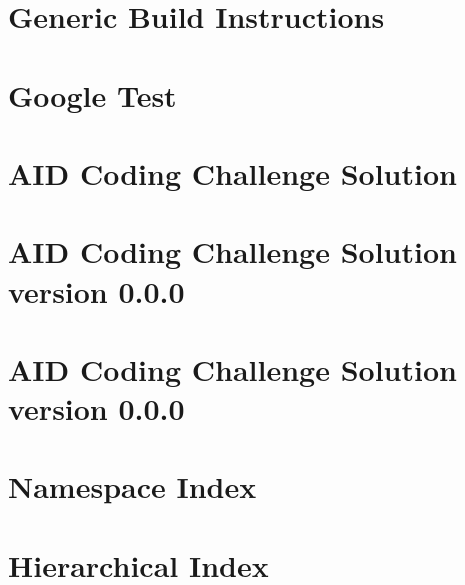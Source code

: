 \documentclass[twoside]{book}
\newcommand{\+}{\discretionary{\mbox{\scriptsize$\hookleftarrow$}}{}{}}
\begin{document}
\chapter{Generic Build Instructions}
\label{md___users_fjp_git_bachelor_bachelor-master_updated_vfinal_googletest-1_88_80_googletest__r_e_a_d_m_e}

\chapter{Google Test}
\label{md___users_fjp_git_bachelor_bachelor-master_updated_vfinal_googletest-1_88_80__r_e_a_d_m_e}

\chapter{A\+ID Coding Challenge Solution}
\label{md___users_fjp_git_bachelor_bachelor-master_updated_vfinal__r_e_a_d_m_e}

\chapter{A\+ID Coding Challenge Solution version 0.0.0}
\label{md___users_fjp_git_bachelor_bachelor-master_updated_vfinal__r_e_a_d_m_e_v0}

\chapter{A\+ID Coding Challenge Solution version 0.0.0}
\label{md___users_fjp_git_bachelor__r_e_a_d_m_e_v0}

\chapter{Namespace Index}

\chapter{Hierarchical Index}

\end{document}

